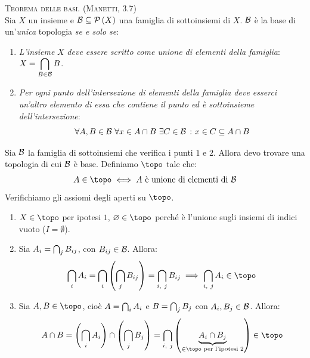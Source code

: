 \begin{theorema}\textsc{Teorema delle basi. (Manetti, 3.7)}\label{teoremabasi}\\
Sia $X$ un insieme e $\mathcal{B}\subseteq\mathcal{P}\left(X\right)$ una famiglia di sottoinsiemi di $X$. $\mathcal{B}$ è la base di un'\textit{unica} topologia \textit{se e solo se}:
\begin{enumerate}
\item \textit{L'insieme} $X$ \textit{deve essere scritto come unione di elementi della famiglia}: $\displaystyle X=\mathop{{\bigcap}}\displaylimits_{B\in \mathcal{B}}B$.
\item \textit{Per ogni punto dell'intersezione di elementi della famiglia deve esserci un'altro elemento di essa che contiene il punto ed è sottoinsieme dell'intersezione}:
\begin{equation}
	\forall A, B\in\mathcal{B}\ \forall x\in A\cap B\ \exists C\in \mathcal{B}\ \colon x\in C\subseteq A\cap B
\end{equation}
\end{enumerate}
\end{theorema}
\begin{demonstration}
Sia $\mathcal{B}$ la famiglia di sottoinsiemi che verifica i punti $1$ e $2$. Allora devo trovare una topologia di cui $\mathcal{B}$ è base. Definiamo $\topo$ tale che:
\begin{equation*}
A\in\topo\iff A\text{ è unione di elementi di }\basis
\end{equation*}
Verifichiamo gli assiomi degli aperti su $\topo$.
\begin{enumerate}[label=\Roman*]
\item $X\in\topo$ per ipotesi $1$, $\emptyset\in\topo$ perché è l'unione sugli insiemi di indici vuoto ($I=\emptyset$).
\item Sia $A_i=\mathop{{\bigcap}}\displaylimits_{j}B_{ij}$, con $B_{ij}\in\mathcal{B}$. Allora:
\begin{equation*}
\union_{i}A_i=\union_{i}\left(\union_{j}B_{ij}\right)=\union_{i,\ j}B_{ij}\implies\union_{i,\ j}A_i\in\topo
\end{equation*}
\item Sia $A, B\in\topo$, cioè $A=\mathop{{\bigcap}}\displaylimits_{i}A_i$ e $B=\mathop{{\bigcap}}\displaylimits_{j}B_j$ con $A_i, B_j\in\mathcal{B}$. Allora:
\begin{equation*}
A\cap B=\left(\union_{i}A_i\right)\cap\left(\union_{j}B_j\right)=\union_{i,\ j}\left(\underbrace{A_i\cap B_j}_{\in\topo\text{ per l'ipotesi }2}\right)\in\topo%
\end{equation*}
\end{enumerate}
\end{demonstration}
